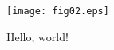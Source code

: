 \documentclass[titlepage,11pt]{article}
\begin{document}
\begin{center}
\texttt{[image: fig02.eps]}
\end{center}
Hello, world!
\end{document}

